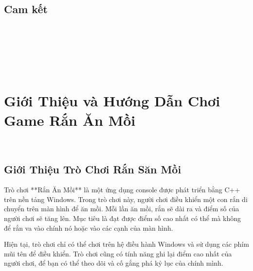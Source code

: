 \documentclass[a4paper,12pt]{article}
\begin{document}
\subsection{Cam kết}
\begin{figure}[htbp]
    \centering
     \\
     \\
    \\
    \\
    \\
\end{figure}
\newpage

\section{Giới Thiệu và Hướng Dẫn Chơi Game Rắn Ăn Mồi}

\maketitle

\begin{figure}[htbp]
    \centering
     \\
\end{figure}

\subsection{Giới Thiệu Trò Chơi Rắn Săn Mồi}
Trò chơi **Rắn Ăn Mồi** là một ứng dụng console được phát triển bằng C++ trên nền tảng Windows. Trong trò chơi này, người chơi điều khiển một con rắn di chuyển trên màn hình để ăn mồi. Mỗi lần ăn mồi, rắn sẽ dài ra và điểm số của người chơi sẽ tăng lên. Mục tiêu là đạt được điểm số cao nhất có thể mà không để rắn va vào chính nó hoặc vào các cạnh của màn hình.

Hiện tại, trò chơi chỉ có thể chơi trên hệ điều hành Windows và sử dụng các phím mũi tên để điều khiển. Trò chơi cũng có tính năng ghi lại điểm cao nhất của người chơi, để bạn có thể theo dõi và cố gắng phá kỷ lục của chính mình.
\end{document}
